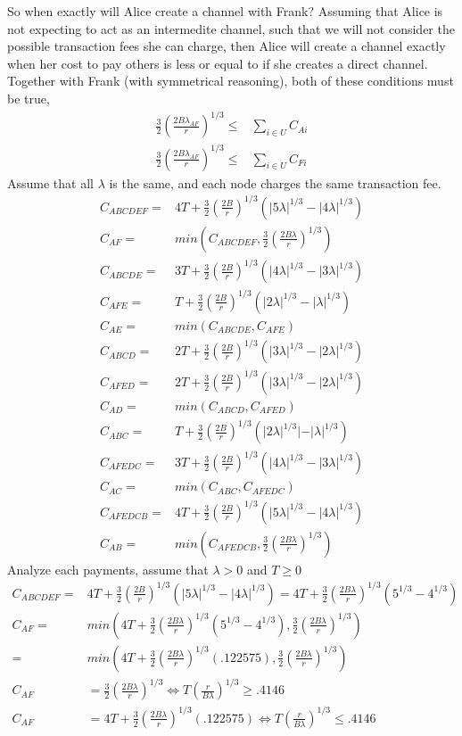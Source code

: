 \documentclass[12pt]{article}
\theoremstyle{plain}
\theoremstyle{remark}
\theoremstyle{definition}
\renewcommand{\geq}{\geqslant}
\renewcommand{\leq}{\leqslant}
\renewcommand{\geq}{\geqslant}
\renewcommand{\leq}{\leqslant}
\begin{document}
So when exactly will Alice create a channel with Frank? Assuming that Alice is not expecting to act as an intermedite channel, such that we will not consider the possible transaction fees she can charge, then Alice will create a channel exactly when her cost to pay others is less or equal to if she creates a direct channel. 
\\Together with Frank (with symmetrical reasoning), both of these conditions must be true,
\begin{align}
  \frac{3}{2}(\frac{2B\lambda_{AF}}{r})^{1/3}\leq & \sum_{i\in U} C_{Ai}\\
  \frac{3}{2}(\frac{2B\lambda_{AF}}{r})^{1/3}\leq & \sum_{i\in U} C_{Fi}
\end{align}
Assume that all $\lambda$ is the same, and each node charges the same transaction fee.
\begin{align}
  C_{ABCDEF} =& 4T+\frac{3}{2}(\frac{2B}{r})^{1/3}(|5\lambda|^{1/3}-|4\lambda|^{1/3})\\
  C_{AF} =& min(C_{ABCDEF}, \frac{3}{2}(\frac{2B\lambda}{r})^{1/3})\\
  C_{ABCDE} = &3T+ \frac{3}{2}(\frac{2B}{r})^{1/3}(|4\lambda|^{1/3}-|3\lambda|^{1/3})\\
  C_{AFE} = &T+ \frac{3}{2}(\frac{2B}{r})^{1/3}(|2\lambda|^{1/3}-|\lambda|^{1/3})\\
  C_{AE} =& min(C_{ABCDE},C_{AFE})\\
  C_{ABCD} = &2T+ \frac{3}{2}(\frac{2B}{r})^{1/3}(|3\lambda|^{1/3}-|2\lambda|^{1/3})\\
  C_{AFED} = &2T+ \frac{3}{2}(\frac{2B}{r})^{1/3}(|3\lambda|^{1/3}-|2\lambda|^{1/3})\\
  C_{AD} =& min(C_{ABCD},C_{AFED})\\
  C_{ABC} = &T+ \frac{3}{2}(\frac{2B}{r})^{1/3}(|2\lambda|^{1/3}|-|\lambda|^{1/3})\\
  C_{AFEDC} = &3T+ \frac{3}{2}(\frac{2B}{r})^{1/3}(|4\lambda|^{1/3}-|3\lambda|^{1/3})\\
  C_{AC} =& min(C_{ABC},C_{AFEDC})\\
  C_{AFEDCB} =& 4T+\frac{3}{2}(\frac{2B}{r})^{1/3}(|5\lambda|^{1/3}-|4\lambda|^{1/3})\\
  C_{AB} =& min(C_{AFEDCB}, \frac{3}{2}(\frac{2B\lambda}{r})^{1/3})
\end{align}
Analyze each payments, assume that $\lambda>0$ and $T\geq 0$
\begin{align}
  C_{ABCDEF} =& 4T+\frac{3}{2}(\frac{2B}{r})^{1/3}(|5\lambda|^{1/3}-|4\lambda|^{1/3}) = 4T+\frac{3}{2}(\frac{2B\lambda}{r})^{1/3}(5^{1/3}-4^{1/3})\\
  C_{AF} =& min(4T+\frac{3}{2}(\frac{2B\lambda}{r})^{1/3}(5^{1/3}-4^{1/3}), \frac{3}{2}(\frac{2B\lambda}{r})^{1/3})\\
  =&min(4T+\frac{3}{2}(\frac{2B\lambda}{r})^{1/3}(.122575), \frac{3}{2}(\frac{2B\lambda}{r})^{1/3})\\
  C_{AF} &=\frac{3}{2}(\frac{2B\lambda}{r})^{1/3}  \iff T(\frac{r}{B\lambda})^{1/3} \geq .4146\\
  C_{AF} &=4T+\frac{3}{2}(\frac{2B\lambda}{r})^{1/3}(.122575) \iff T(\frac{r}{B\lambda})^{1/3} \leq .4146
\end{align}
\end{document}
